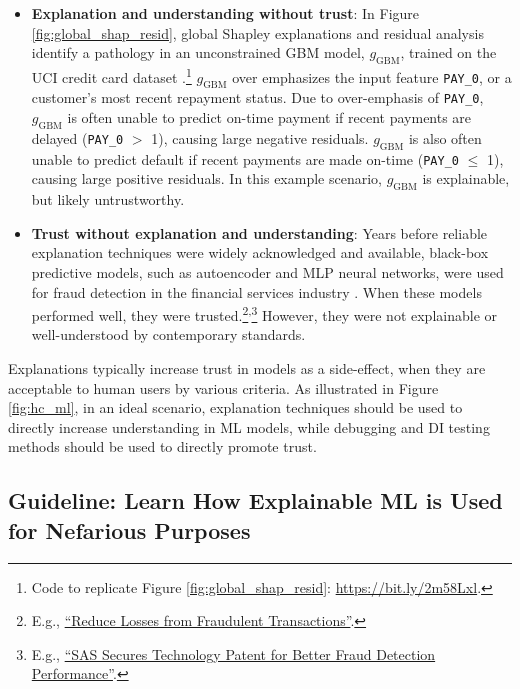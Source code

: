 \documentclass{article}
\begin{document}
\begin{itemize}

\item \textbf{Explanation and understanding without trust}: In Figure \ref{fig:global_shap_resid}, global Shapley explanations and residual analysis identify a pathology in an unconstrained GBM model, $g_{\text{GBM}}$, trained on the UCI credit card dataset \cite{uci}.\footnote{\scriptsize{Code to replicate Figure \ref{fig:global_shap_resid}: \url{https://bit.ly/2m58Lxl}.}} $g_{\text{GBM}}$ over emphasizes the input feature \texttt{PAY\_0}, or a customer's most recent repayment status. Due to over-emphasis of \texttt{PAY\_0}, $g_{\text{GBM}}$ is often unable to predict on-time payment if recent payments are delayed (\texttt{PAY\_0} $>$ 1), causing large negative residuals. $g_{\text{GBM}}$ is also often unable to predict default if recent payments are made on-time (\texttt{PAY\_0} $\leq$ 1), causing large positive residuals. In this example scenario, $g_{\text{GBM}}$ is explainable, but likely untrustworthy. 

\item \textbf{Trust without explanation and understanding}: Years before reliable explanation techniques were widely acknowledged and available, black-box predictive models, such as autoencoder and MLP neural networks, were used for fraud detection in the financial services industry \cite{gopinathan1998fraud}. When these models performed well, they were trusted.\footnote{\scriptsize{E.g., \href{https://www.sas.com/en_ph/customers/hsbc.html}{``Reduce Losses from Fraudulent Transactions''}.}}\textsuperscript{,}\footnote{\scriptsize{E.g., \href{https://www.kdnuggets.com/2011/03/sas-patent-fraud-detection.html}{``SAS Secures Technology Patent for Better Fraud Detection Performance''}.}} However, they were not explainable or well-understood by contemporary standards.  

\end{itemize}
Explanations typically increase trust in models as a side-effect, when they are acceptable to human users by various criteria. As illustrated in Figure \ref{fig:hc_ml}, in an ideal scenario, explanation techniques should be used to directly increase understanding in ML models, while debugging and DI testing methods should be used to directly promote trust.

\subsection{Guideline: Learn How Explainable ML is Used for Nefarious Purposes}
\end{document}
